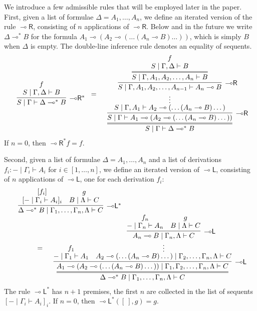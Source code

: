 \documentclass[sn-mathphys-num]{sn-jnl}%
\newcommand{\ldbc}{[\![}
\newcommand{\rdbc}{]\!]}
\newcommand{\GG}{\Gamma}
\newcommand{\GD}{\Delta}
\newcommand{\GL}{\Lambda}
\newcommand{\vd}{\vdash}
\newcommand{\lolli}{\multimap}
\newcommand{\lleft}{{\lolli}\mathsf{L}}
\newcommand{\lright}{{\lolli}\mathsf{R}}
\newcommand{\proofbox}[1]{\begin{tabular}{l} #1 \end{tabular}}
\newcommand{\niccolo}[1]{\textcolor{red}{NV: #1}}
\theoremstyle{thmstyleone}%
\theoremstyle{thmstyletwo}%
\theoremstyle{thmstylethree}%
\begin{document}
We introduce a few admissible rules that will be employed later in the paper.
First, given a list of formulae $\GD = A_1,\dots,A_n$, we define an iterated version of the rule $\lright$, consisting of $n$ applications of $\lright$. Below and in the future we write $\GD \lolli^* B$ for the formula $A_1 \lolli (A_2 \lolli (\dots (A_n \lolli B) \dots ))$, which is simply $B$ when $\GD$ is empty. The double-line inference rule denotes an equality of sequents.
\begin{equation}\label{-oR*}
  \begin{array}{l}
    \proofbox{\infer[\lright^*]{S \mid \GG \vd \GD \lolli^* B}{
    \deduce{S \mid \GG , \GD \vd B}{f}
    }}
    =
    \proofbox{
    \infer={S \mid \GG \vd \GD \lolli^* B}{
    \infer[\lright]{S \mid \GG \vd A_1 \lolli (A_2 \lolli (\dots (A_n \lolli B) \dots ))}{
    \deduce[\vdots]{S \mid \GG, A_1 \vd A_2 \lolli (\dots (A_n \lolli B) \dots )}{
    \infer[\lright]{S \mid \GG , A_1, A_2, \dots, A_{n-1} \vd A_n \lolli B}{
    \infer={S \mid \GG , A_1, A_2, \dots, A_n \vd B}{
    \deduce{S \mid \GG , \GD \vd B}{f}
    }
    }
    }
    }
    }
    }
  \end{array}
\end{equation}
If $n = 0$, then $\lright^* f = f$.

Second, given a list of formulae $\GD = A_1,\dots,A_n$ and a list of derivations $f_i : {-} \mid \GG_i \vd A_i$ for $i \in [1,\dots , n]$, we define an iterated version of $\lleft$, consisting of $n$ applications of $\lleft$, one for each derivation $f_i$:
\begin{equation}\label{-oL*}
  \begin{array}{l}
    \proofbox{\infer[\lleft^*]{\GD \lolli^* B \mid \GG_1,\dots,\GG_n,\GL \vd C}{
    \deduce{[ {-} \mid \GG_i \vd A_i]_i}{[f_i]}
    &
    \deduce{B \mid \GL \vd C}{g}
    }}
    \\
    \qquad \qquad =
    \proofbox{
    \infer={\GD \lolli^* B \mid \GG_1,\dots,\GG_n,\GL \vd C}{
    \infer[\lleft]{A_1 \lolli (A_2 \lolli (\dots (A_n \lolli B) \dots )) \mid \GG_1,\GG_2,\dots,\GG_n,\GL \vd C}{
    \deduce{{-} \mid \GG_1 \vd A_1}{f_1}
    &
    \deduce[\vdots]{A_2 \lolli (\dots (A_n \lolli B) \dots ) \mid \GG_2,\dots,\GG_n,\GL \vd C}{
    \infer[\lleft]{A_n \lolli B \mid \GG_n , \GL \vd C}{
    \deduce{{-} \mid \GG_n \vd A_n}{f_n}
    &
    \deduce{B \mid \GL \vd C}{g}
    }
    }
    }
    }
    }
  \end{array}
\end{equation}
The rule $\lleft^*$ has $n+1$ premises, the first $n$ are collected in the list of sequents $[ {-} \mid \GG_i \vd A_i]_i$.
If $n=0$, then $\lleft^* ([\ ],g) = g$.
\end{document}
